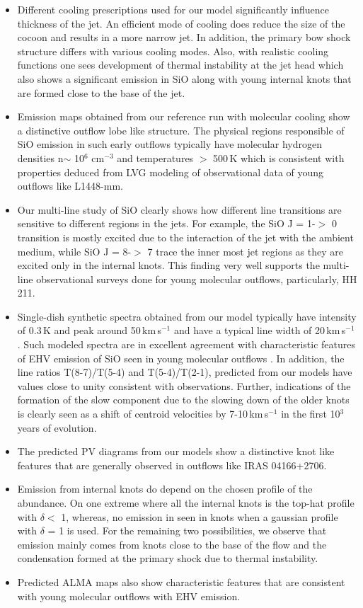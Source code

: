 \documentclass[useAMS,usenatbib]{mn2e}
\begin{document}
\begin{itemize}
\item Different cooling prescriptions used for our model
  significantly influence thickness of the jet. An
  efficient mode of cooling does reduce the size of the cocoon and results
  in a more narrow jet. In addition, the primary bow shock structure
  differs with various cooling modes. Also, with realistic cooling
  functions one sees development of
  thermal instability at the jet head which also shows a significant emission in SiO
  along with young internal knots that are formed close to the base of
  the jet.
\item Emission maps obtained from our reference run with molecular
  cooling show a distinctive outflow lobe like structure. The
  physical regions responsible of SiO emission in such early outflows
  typically have molecular hydrogen densities n$\sim$ 10$^{6}$
  cm$^{-3}$ and temperatures $>$ 500\,K which is consistent with
  properties deduced from LVG modeling of observational data of
  young outflows like L1448-mm.
\item Our multi-line study of SiO clearly shows how different
  line transitions are sensitive to different regions in the jets. For
  example, the SiO J = 1-$>$ 0 transition is mostly excited due to
  the interaction of the jet with the ambient medium, while SiO J = 8-$>$ 7 trace the inner most jet regions as
  they are excited only in the internal knots. This finding very well
  supports the multi-line observational surveys done for young
  molecular outflows, particularly, HH 211.
\item Single-dish synthetic spectra obtained from our model typically
  have intensity of 0.3\,K and peak around 50\,km\,s$^{-1}$ and have a
  typical line width of 20\,km\,s$^{-1}$. Such modeled spectra are in
  excellent agreement with characteristic features of EHV emission of
  SiO seen in young molecular outflows . In addition, the line ratios 
  T(8-7)/T(5-4) and T(5-4)/T(2-1), predicted from our models have values close to
  unity consistent with observations. Further,
  indications of the formation of the slow component due to the
  slowing down of the
  older knots is clearly seen as a shift of centroid velocities by
  7-10\,km\,s$^{-1}$ in the first 10$^{3}$ years of evolution.
\item The predicted PV diagrams from our models show a distinctive
  knot like features that are generally observed in outflows like IRAS
  04166+2706.
\item Emission from internal knots do depend on the chosen profile of
  the abundance. On one extreme where all the internal knots 
  is the top-hat profile with $\delta <$ 1, whereas, no emission in
  seen in knots when a gaussian profile with $\delta$ = 1 is used. For
  the remaining two possibilities, we observe that emission mainly
  comes from knots close to the base of the flow and the condensation
  formed at the primary shock due to thermal instability.
\item Predicted ALMA maps also show characteristic features that are
  consistent with young molecular outflows with EHV emission. 
\end{itemize}
\end{document}
